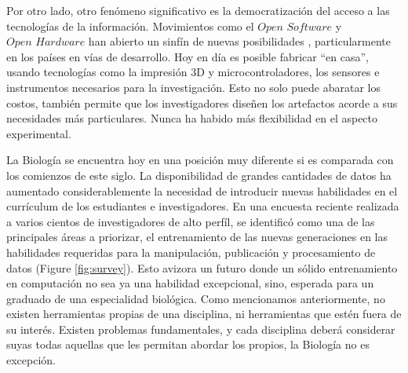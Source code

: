 Por otro lado, otro fenómeno significativo es la democratización del acceso a las tecnologías de la información.
Movimientos como el $\textit{Open Software}$ y $\textit{Open Hardware}$ han abierto un sinfín de nuevas posibilidades \cite{ravindranHowDIYTechnologies2020}, particularmente en los países en vías de desarrollo.
Hoy en día es posible fabricar ``en casa'', usando tecnologías como la impresión 3D y microcontroladores, los sensores e instrumentos necesarios para la investigación.
Esto no solo puede abaratar los costos, también permite que los investigadores diseñen los artefactos acorde a sus necesidades más particulares.
Nunca ha habido más flexibilidad en el aspecto experimental.

La Biología se encuentra hoy en una posición muy diferente si es comparada con los comienzos de este siglo.
La disponibilidad de grandes cantidades de datos ha aumentado considerablemente la necesidad de introducir nuevas habilidades en el currículum de los estudiantes e investigadores.
En una encuesta reciente realizada a varios cientos de investigadores de alto perfíl, se identificó como una de las principales áreas a priorizar, el entrenamiento de las nuevas generaciones en las habilidades requeridas para la manipulación, publicación y procesamiento de datos \cite{baroneUnmetNeedsAnalyzing2017} (Figure \ref{fig:survey}).
Esto avizora un futuro donde un sólido entrenamiento en computación no sea ya una habilidad excepcional, sino, esperada para un graduado de una especialidad biológica.
Como mencionamos anteriormente, no existen herramientas propias de una disciplina, ni herramientas que estén fuera de su interés. Existen problemas fundamentales, y cada disciplina deberá considerar suyas todas aquellas que les permitan abordar los propios, la Biología no es excepción.
 
\rightline{$\blacksquare$}
 

